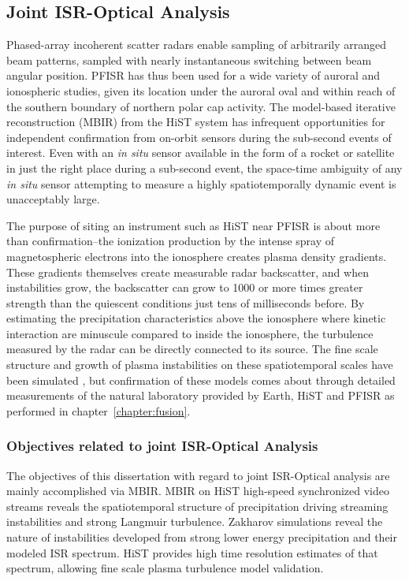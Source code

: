 \FloatBarrier
\subsection{Joint ISR-Optical Analysis}\label{sec:isrbasic}
Phased-array incoherent scatter radars enable sampling of arbitrarily arranged beam patterns, sampled with nearly instantaneous switching between beam angular position.
PFISR has thus been used for a wide variety of auroral and ionospheric studies, given its location under the auroral oval and within reach of the southern boundary of northern polar cap activity.
The model-based iterative reconstruction (MBIR) from the HiST system has infrequent opportunities for independent confirmation from on-orbit sensors during the sub-second events of interest.
Even with an \textit{in situ} sensor available in the form of a rocket or satellite in just the right place during a sub-second event, the space-time ambiguity of any \textit{in situ} sensor attempting to measure a highly spatiotemporally dynamic event is unacceptably large.

The purpose of siting an instrument such as HiST near PFISR is about more than confirmation--the ionization production by the intense spray of magnetospheric electrons into the ionosphere creates plasma density gradients.
These gradients themselves create measurable radar backscatter, and when instabilities grow, the backscatter can grow to 1000 or more times greater strength than the quiescent conditions just tens of milliseconds before.
By estimating the precipitation characteristics above the ionosphere where kinetic interaction are minuscule compared to inside the ionosphere, the turbulence measured by the radar can be directly connected to its source.
The fine scale structure and growth of plasma instabilities on these spatiotemporal scales have been simulated \citep{akbari2015}, but confirmation of these models comes about through detailed measurements of the natural laboratory provided by Earth, HiST and PFISR as performed in chapter~\ref{chapter:fusion}.

\subsubsection{Objectives related to joint ISR-Optical Analysis}
The objectives of this dissertation with regard to joint ISR-Optical analysis are mainly accomplished via MBIR. 
MBIR on HiST high-speed synchronized video streams reveals the spatiotemporal structure of precipitation driving streaming instabilities and strong Langmuir turbulence.
Zakharov simulations \citep{akbari2015,zakharov1d} reveal the nature of instabilities developed from strong lower energy precipitation and their modeled ISR spectrum.
HiST provides high time resolution estimates of that spectrum, allowing fine scale plasma turbulence model validation.